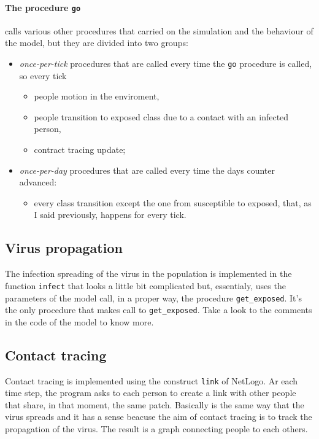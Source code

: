 \documentclass[12pt]{llncs}
\begin{document}
\paragraph{The procedure \texttt{go}} calls various other procedures that carried on the simulation and the behaviour of the model, but they are divided into two groups:
\begin{itemize}
\item \textit{once-per-tick} procedures that are called every time the \texttt{go} procedure is called, so every tick
\begin{itemize}
\item people motion in the enviroment, 
\item people transition to exposed class due to a contact with an infected person,
\item contract tracing update;
\end{itemize}
\item \textit{once-per-day} procedures that are called every time the days counter advanced:
\begin{itemize}
\item every class transition except the one from susceptible to exposed, that, as I said previously, happens for every tick.
\end{itemize}
\end{itemize}

\subsection{Virus propagation}
The infection spreading of the virus in the population is implemented in the function \texttt{infect} that looks a little bit complicated but, essentialy, uses the parameters of the model call, in a proper way, the procedure \texttt{get\_exposed}. It's the only procedure that makes call to \texttt{get\_exposed}. Take a look to the comments in the code of the model to know more.

\subsection{Contact tracing}
Contact tracing is implemented using the construct \texttt{link} of NetLogo. Ar each time step, the program asks to each person to create a link with other people that share, in that moment, the same patch. Basically is the same way that the virus spreads and it has a sense beacuse the aim of contact tracing is to track the propagation of the virus. The result is a graph connecting people to each others.
\end{document}
